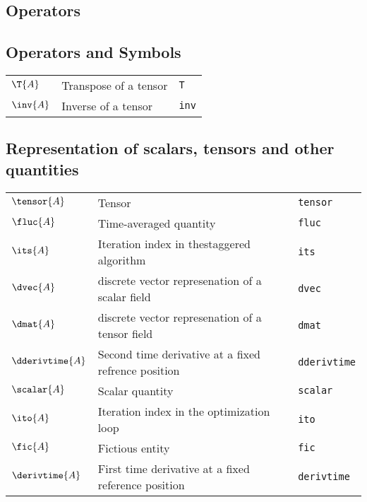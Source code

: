 \subsection*{Operators}

\subsection*{Operators and Symbols}
\begin{tabular}{l l l}
$\T{A}$ & Transpose of a tensor& \texttt{T}\\
$\inv{A}$ & Inverse of a tensor& \texttt{inv}\\
\end{tabular}

\subsection*{Representation of scalars, tensors and other quantities}
\begin{tabular}{l l l}
$\tensor{A}$ & Tensor& \texttt{tensor}\\
$\fluc{A}$ & Time-averaged quantity& \texttt{fluc}\\
$\its{A}$ & Iteration index in thestaggered algorithm& \texttt{its}\\
$\dvec{A}$ & discrete vector represenation of a scalar field& \texttt{dvec}\\
$\dmat{A}$ & discrete vector represenation of a tensor field& \texttt{dmat}\\
$\dderivtime{A}$ & Second time derivative at a fixed refrence position& \texttt{dderivtime}\\
$\scalar{A}$ & Scalar quantity& \texttt{scalar}\\
$\ito{A}$ & Iteration index in the optimization loop& \texttt{ito}\\
$\fic{A}$ & Fictious entity& \texttt{fic}\\
$\derivtime{A}$ & First time derivative at a fixed reference position& \texttt{derivtime}\\
\end{tabular}

